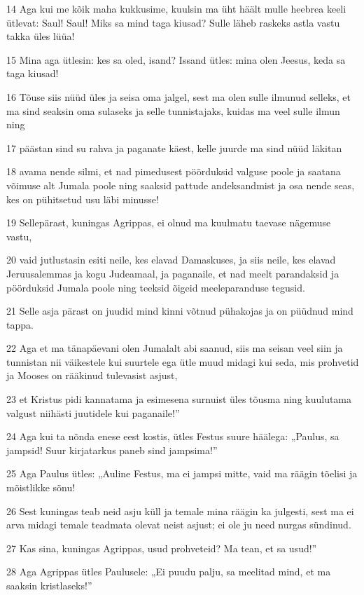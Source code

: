 \par 14 Aga kui me kõik maha kukkusime, kuulsin ma üht häält mulle heebrea keeli ütlevat: Saul! Saul! Miks sa mind taga kiusad? Sulle läheb raskeks astla vastu takka üles lüüa!
\par 15 Mina aga ütlesin: kes sa oled, isand? Issand ütles: mina olen Jeesus, keda sa taga kiusad!
\par 16 Tõuse siis nüüd üles ja seisa oma jalgel, sest ma olen sulle ilmunud selleks, et ma sind seaksin oma sulaseks ja selle tunnistajaks, kuidas ma veel sulle ilmun ning
\par 17 päästan sind su rahva ja paganate käest, kelle juurde ma sind nüüd läkitan
\par 18 avama nende silmi, et nad pimedusest pöörduksid valguse poole ja saatana võimuse alt Jumala poole ning saaksid pattude andeksandmist ja osa nende seas, kes on pühitsetud usu läbi minusse!
\par 19 Sellepärast, kuningas Agrippas, ei olnud ma kuulmatu taevase nägemuse vastu,
\par 20 vaid jutlustasin esiti neile, kes elavad Damaskuses, ja siis neile, kes elavad Jeruusalemmas ja kogu Judeamaal, ja paganaile, et nad meelt parandaksid ja pöörduksid Jumala poole ning teeksid õigeid meeleparanduse tegusid.
\par 21 Selle asja pärast on juudid mind kinni võtnud pühakojas ja on püüdnud mind tappa.
\par 22 Aga et ma tänapäevani olen Jumalalt abi saanud, siis ma seisan veel siin ja tunnistan nii väikestele kui suurtele ega ütle muud midagi kui seda, mis prohvetid ja Mooses on rääkinud tulevasist asjust,
\par 23 et Kristus pidi kannatama ja esimesena surnuist üles tõusma ning kuulutama valgust niihästi juutidele kui paganaile!”
\par 24 Aga kui ta nõnda enese eest kostis, ütles Festus suure häälega: „Paulus, sa jampsid! Suur kirjatarkus paneb sind jampsima!”
\par 25 Aga Paulus ütles: „Auline Festus, ma ei jampsi mitte, vaid ma räägin tõelisi ja mõistlikke sõnu!
\par 26 Sest kuningas teab neid asju küll ja temale mina räägin ka julgesti, sest ma ei arva midagi temale teadmata olevat neist asjust; ei ole ju need nurgas sündinud.
\par 27 Kas sina, kuningas Agrippas, usud prohveteid? Ma tean, et sa usud!”
\par 28 Aga Agrippas ütles Paulusele: „Ei puudu palju, sa meelitad mind, et ma saaksin kristlaseks!”
